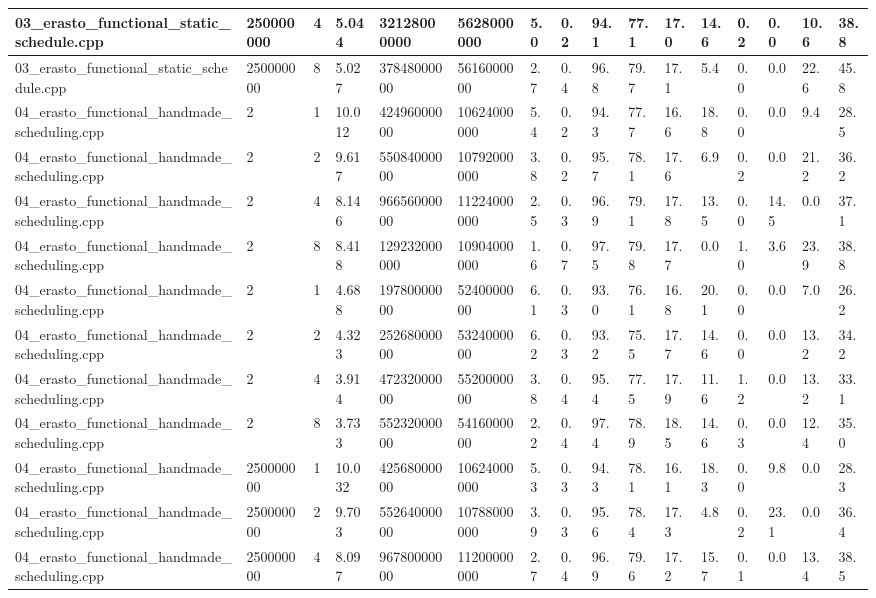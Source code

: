 \documentclass[12pt]{article}
\begin{document}
\begin{flushleft}
\begin{tabular}{| l | l | l | l | l | l | l | l | l | l | l | l | l | l | l | l |}
		03\_erasto\_functional\_static\_schedule.cpp & 250000000 & 4 & 5.044 & 32128000000 & 5628000000 & 5.0 & 0.2 & 94.1 & 77.1 & 17.0 & 14.6 & 0.2 & 0.0 & 10.6 & 38.8 \\ \hline
		03\_erasto\_functional\_static\_schedule.cpp & 250000000 & 8 & 5.027 & 37848000000 & 5616000000 & 2.7 & 0.4 & 96.8 & 79.7 & 17.1 & 5.4 & 0.0 & 0.0 & 22.6 & 45.8 \\ \hline
		04\_erasto\_functional\_handmade\_scheduling.cpp & 2 & 1 & 10.012 & 42496000000 & 10624000000 & 5.4 & 0.2 & 94.3 & 77.7 & 16.6 & 18.8 & 0.0 & 0.0 & 9.4 & 28.5 \\ \hline
		04\_erasto\_functional\_handmade\_scheduling.cpp & 2 & 2 & 9.617 & 55084000000 & 10792000000 & 3.8 & 0.2 & 95.7 & 78.1 & 17.6 & 6.9 & 0.2 & 0.0 & 21.2 & 36.2 \\ \hline
		04\_erasto\_functional\_handmade\_scheduling.cpp & 2 & 4 & 8.146 & 96656000000 & 11224000000 & 2.5 & 0.3 & 96.9 & 79.1 & 17.8 & 13.5 & 0.0 & 14.5 & 0.0 & 37.1 \\ \hline
		04\_erasto\_functional\_handmade\_scheduling.cpp & 2 & 8 & 8.418 & 129232000000 & 10904000000 & 1.6 & 0.7 & 97.5 & 79.8 & 17.7 & 0.0 & 1.0 & 3.6 & 23.9 & 38.8 \\ \hline
		04\_erasto\_functional\_handmade\_scheduling.cpp & 2 & 1 & 4.688 & 19780000000 & 5240000000 & 6.1 & 0.3 & 93.0 & 76.1 & 16.8 & 20.1 & 0.0 & 0.0 & 7.0 & 26.2 \\ \hline
		04\_erasto\_functional\_handmade\_scheduling.cpp & 2 & 2 & 4.323 & 25268000000 & 5324000000 & 6.2 & 0.3 & 93.2 & 75.5 & 17.7 & 14.6 & 0.0 & 0.0 & 13.2 & 34.2 \\ \hline
		04\_erasto\_functional\_handmade\_scheduling.cpp & 2 & 4 & 3.914 & 47232000000 & 5520000000 & 3.8 & 0.4 & 95.4 & 77.5 & 17.9 & 11.6 & 1.2 & 0.0 & 13.2 & 33.1 \\ \hline
		04\_erasto\_functional\_handmade\_scheduling.cpp & 2 & 8 & 3.733 & 55232000000 & 5416000000 & 2.2 & 0.4 & 97.4 & 78.9 & 18.5 & 14.6 & 0.3 & 0.0 & 12.4 & 35.0 \\ \hline
		04\_erasto\_functional\_handmade\_scheduling.cpp & 250000000 & 1 & 10.032 & 42568000000 & 10624000000 & 5.3 & 0.3 & 94.3 & 78.1 & 16.1 & 18.3 & 0.0 & 9.8 & 0.0 & 28.3 \\ \hline
		04\_erasto\_functional\_handmade\_scheduling.cpp & 250000000 & 2 & 9.703 & 55264000000 & 10788000000 & 3.9 & 0.3 & 95.6 & 78.4 & 17.3 & 4.8 & 0.2 & 23.1 & 0.0 & 36.4 \\ \hline
		04\_erasto\_functional\_handmade\_scheduling.cpp & 250000000 & 4 & 8.097 & 96780000000 & 11200000000 & 2.7 & 0.4 & 96.9 & 79.6 & 17.2 & 15.7 & 0.1 & 0.0 & 13.4 & 38.5 \\ \hline

\end{tabular}
\end{flushleft}
\end{document}
